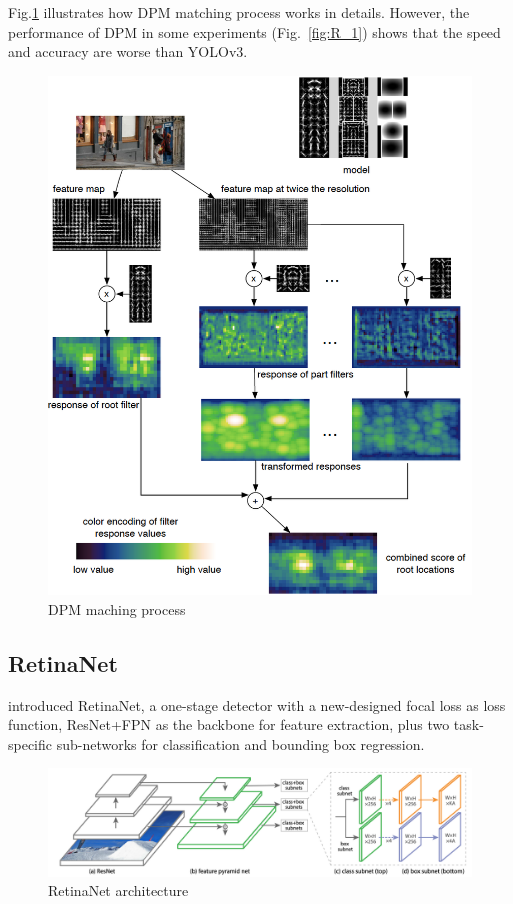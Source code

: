 \documentclass[letterpaper]{article} %
\begin{document}
\noindent Fig.\ref{fig:DPM_2} illustrates how DPM matching process works in details. However, the performance of DPM in some experiments (Fig.~\ref{fig:R_1}) shows that the speed and accuracy are worse than YOLOv3.\\
\begin{figure}[ht]
\hspace{-18mm}
\centering
\includegraphics[width=0.85\linewidth,height = 1.0\linewidth]{Figure/DPM_2.png}
\caption{\footnotesize{DPM maching process}}
\label{fig:DPM_2}
\vspace{-3mm}
\end{figure}

\subsection{RetinaNet}
\citeyear{retinaNet} introduced RetinaNet, a one-stage detector with a new-designed focal loss as loss function, ResNet+FPN as the backbone for feature extraction, plus two task-specific sub-networks for classification and bounding box regression.\\
\begin{figure}[ht]
\hspace{-16mm}
\centering
\includegraphics[scale = 0.2]{Figure/retinanet.png}
\caption{\footnotesize{RetinaNet architecture}}
\label{fig:retinanet}
\vspace{0mm}
\end{figure}
\end{document}

